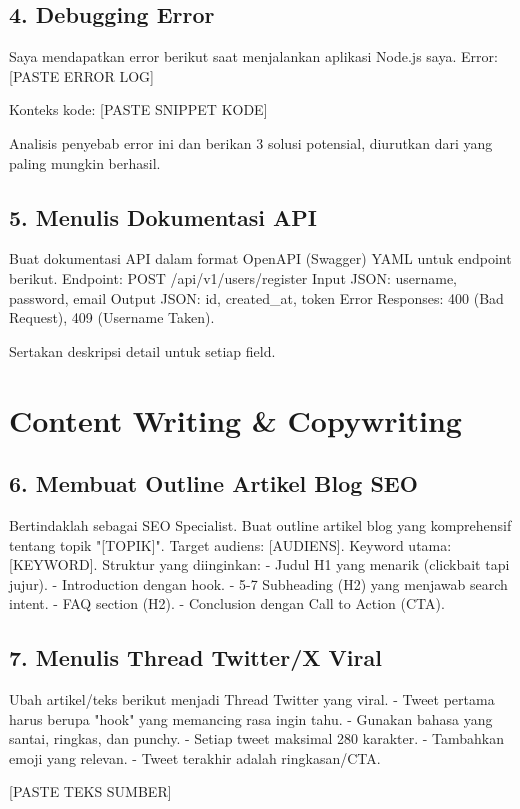 \subsection{4. Debugging Error}
\begin{promptbox}
Saya mendapatkan error berikut saat menjalankan aplikasi Node.js saya.
Error: [PASTE ERROR LOG]

Konteks kode:
[PASTE SNIPPET KODE]

Analisis penyebab error ini dan berikan 3 solusi potensial, diurutkan dari yang paling mungkin berhasil.
\end{promptbox}

\subsection{5. Menulis Dokumentasi API}
\begin{promptbox}
Buat dokumentasi API dalam format OpenAPI (Swagger) YAML untuk endpoint berikut.
Endpoint: POST /api/v1/users/register
Input JSON: {username, password, email}
Output JSON: {id, created_at, token}
Error Responses: 400 (Bad Request), 409 (Username Taken).

Sertakan deskripsi detail untuk setiap field.
\end{promptbox}

\section{Content Writing & Copywriting}

\subsection{6. Membuat Outline Artikel Blog SEO}
\begin{promptbox}
Bertindaklah sebagai SEO Specialist. Buat outline artikel blog yang komprehensif tentang topik "[TOPIK]".
Target audiens: [AUDIENS].
Keyword utama: [KEYWORD].
Struktur yang diinginkan:
- Judul H1 yang menarik (clickbait tapi jujur).
- Introduction dengan hook.
- 5-7 Subheading (H2) yang menjawab search intent.
- FAQ section (H2).
- Conclusion dengan Call to Action (CTA).
\end{promptbox}

\subsection{7. Menulis Thread Twitter/X Viral}
\begin{promptbox}
Ubah artikel/teks berikut menjadi Thread Twitter yang viral.
- Tweet pertama harus berupa "hook" yang memancing rasa ingin tahu.
- Gunakan bahasa yang santai, ringkas, dan punchy.
- Setiap tweet maksimal 280 karakter.
- Tambahkan emoji yang relevan.
- Tweet terakhir adalah ringkasan/CTA.

[PASTE TEKS SUMBER]
\end{promptbox}

